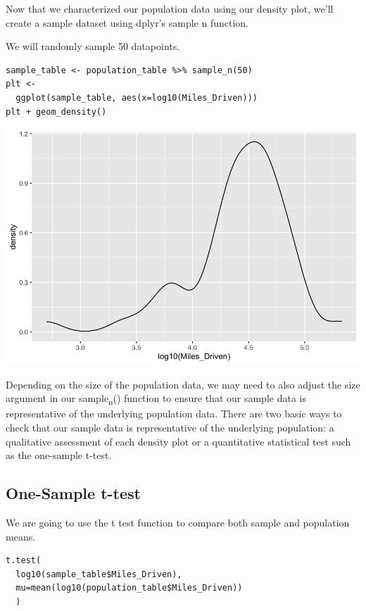 \documentclass[11pt]{article}
\begin{document}
Now that we characterized our population data using our density plot, we'll create a sample dataset using dplyr's sample n function.

We will randomly sample 50 datapoints.
\begin{verbatim}
sample_table <- population_table %>% sample_n(50)
plt <-
  ggplot(sample_table, aes(x=log10(Miles_Driven)))
plt + geom_density()
\end{verbatim}

\begin{org}
\begin{center}
\includegraphics[width=.9\linewidth]{./resources/used_car_density.png}
\end{center}
\end{org}

Depending on the size of the population data, we may need to also adjust the size argument in our sample\textsubscript{n}() function to ensure that our sample data is representative of the underlying population data. There are two basic ways to check that our sample data is representative of the underlying population: a qualitative assessment of each density plot or a quantitative statistical test such as the one-sample t-test.

\subsection{One-Sample t-test}
\label{sec:org01515e9}

We are going to use the t test function to compare both sample and population means.

\begin{verbatim}
t.test(
  log10(sample_table$Miles_Driven),
  mu=mean(log10(population_table$Miles_Driven))
  )
\end{verbatim}
\end{document}
